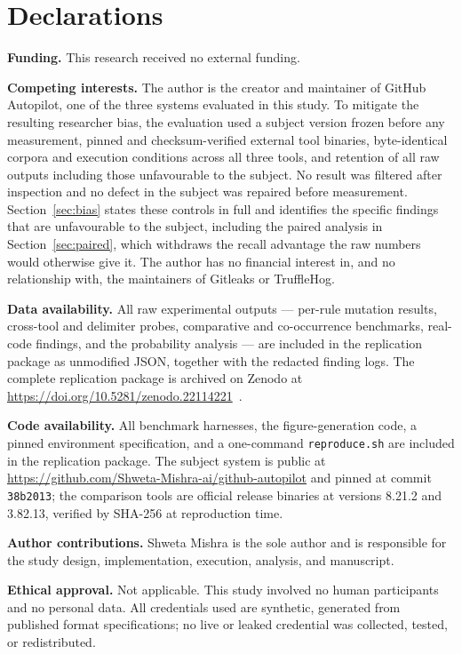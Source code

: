 \documentclass[journal]{IEEEtran}
\begin{document}
\section*{Declarations}

\textbf{Funding.} This research received no external funding.

\textbf{Competing interests.} The author is the creator and maintainer of GitHub Autopilot, one of the three systems evaluated in this study. To mitigate the resulting researcher bias, the evaluation used a subject version frozen before any measurement, pinned and checksum-verified external tool binaries, byte-identical corpora and execution conditions across all three tools, and retention of all raw outputs including those unfavourable to the subject. No result was filtered after inspection and no defect in the subject was repaired before measurement. Section~\ref{sec:bias} states these controls in full and identifies the specific findings that are unfavourable to the subject, including the paired analysis in Section~\ref{sec:paired}, which withdraws the recall advantage the raw numbers would otherwise give it. The author has no financial interest in, and no relationship with, the maintainers of Gitleaks or TruffleHog.

\textbf{Data availability.} All raw experimental outputs --- per-rule mutation results, cross-tool and delimiter probes, comparative and co-occurrence benchmarks, real-code findings, and the probability analysis --- are included in the replication package as unmodified JSON, together with the redacted finding logs. The complete replication package is archived on Zenodo at \url{https://doi.org/10.5281/zenodo.22114221}~\cite{mishra2026zenodo}.

\textbf{Code availability.} All benchmark harnesses, the figure-generation code, a pinned environment specification, and a one-command \texttt{reproduce.sh} are included in the replication package. The subject system is public at \url{https://github.com/Shweta-Mishra-ai/github-autopilot} and pinned at commit \texttt{38b2013}; the comparison tools are official release binaries at versions 8.21.2 and 3.82.13, verified by SHA-256 at reproduction time.

\textbf{Author contributions.} Shweta Mishra is the sole author and is responsible for the study design, implementation, execution, analysis, and manuscript.

\textbf{Ethical approval.} Not applicable. This study involved no human participants and no personal data. All credentials used are synthetic, generated from published format specifications; no live or leaked credential was collected, tested, or redistributed.
\end{document}

